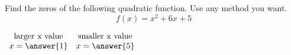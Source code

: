 \documentclass{ximera}
\author{David Kish}
\begin{document}
\begin{exercise}
Find the zeros of the following quadratic function. Use any method you want. 
\[
f(x) = x^2+6x + 5
\]

\begin{center}
$
\begin{array}{cc}
\text{larger x value} & \text{smaller x value}\\
x  = \answer{1} & x = \answer{5}
\end{array}
$
\end{center}
\end{exercise}
\end{document}
